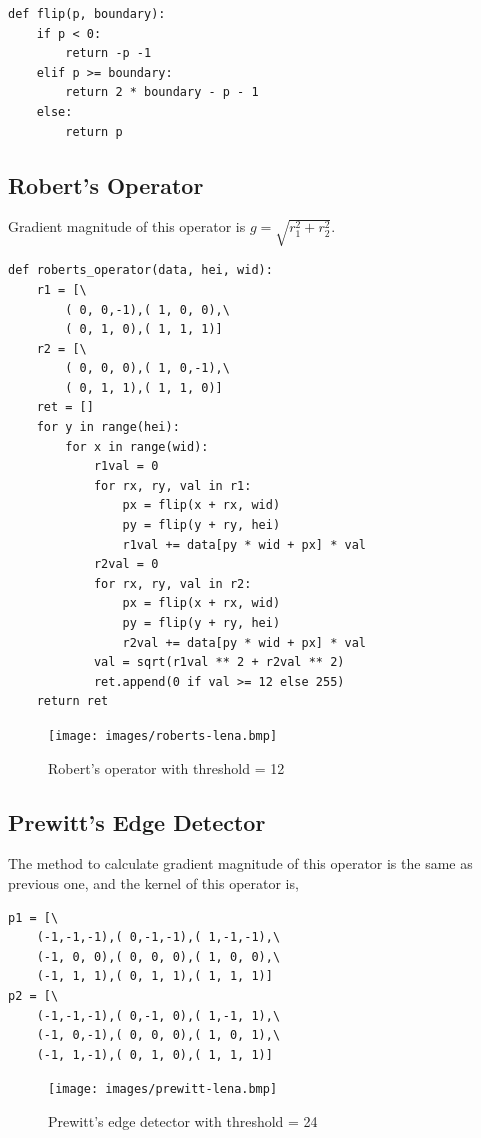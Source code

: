 \documentclass[14pt,a4paper]{extarticle}
\begin{document}
\begin{lstlisting}
def flip(p, boundary):
	if p < 0:
		return -p -1
	elif p >= boundary:
		return 2 * boundary - p - 1
	else:
		return p
\end{lstlisting}

\subsection{Robert's Operator}

Gradient magnitude of this operator is $g = \sqrt{r_1^2 + r_2^2}$.

\begin{lstlisting}
def roberts_operator(data, hei, wid):
	r1 = [\
		( 0, 0,-1),( 1, 0, 0),\
		( 0, 1, 0),( 1, 1, 1)]
	r2 = [\
		( 0, 0, 0),( 1, 0,-1),\
		( 0, 1, 1),( 1, 1, 0)]
	ret = []
	for y in range(hei):
		for x in range(wid):
			r1val = 0
			for rx, ry, val in r1:
				px = flip(x + rx, wid)
				py = flip(y + ry, hei)
				r1val += data[py * wid + px] * val
			r2val = 0
			for rx, ry, val in r2:
				px = flip(x + rx, wid)
				py = flip(y + ry, hei)
				r2val += data[py * wid + px] * val
			val = sqrt(r1val ** 2 + r2val ** 2)
			ret.append(0 if val >= 12 else 255)
	return ret
\end{lstlisting}

\begin{figure}[H]
\centering
\texttt{[image: images/roberts-lena.bmp]}
\caption{Robert's operator with threshold = 12}
\end{figure}

\subsection{Prewitt's Edge Detector}

The method to calculate gradient magnitude of this operator is the same as previous one, and the kernel of this operator is,
\begin{lstlisting}
p1 = [\
	(-1,-1,-1),( 0,-1,-1),( 1,-1,-1),\
	(-1, 0, 0),( 0, 0, 0),( 1, 0, 0),\
	(-1, 1, 1),( 0, 1, 1),( 1, 1, 1)]
p2 = [\
	(-1,-1,-1),( 0,-1, 0),( 1,-1, 1),\
	(-1, 0,-1),( 0, 0, 0),( 1, 0, 1),\
	(-1, 1,-1),( 0, 1, 0),( 1, 1, 1)]
\end{lstlisting}

\begin{figure}[H]
\centering
\texttt{[image: images/prewitt-lena.bmp]}
\caption{Prewitt's edge detector with threshold = 24}
\end{figure}
\end{document}
